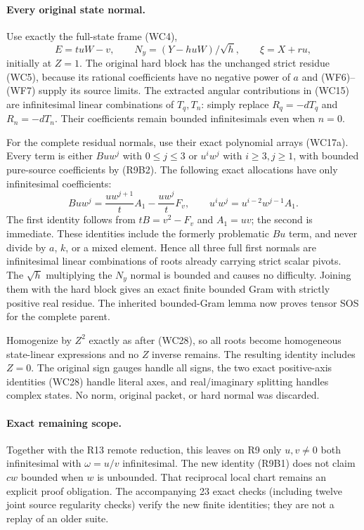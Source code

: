 \paragraph{Every original state normal.}
Use exactly the full-state frame (WC4),
\[
 E=tuW-v,\qquad N_y=(Y-huW)/\sqrt h,
 \qquad \xi=X+ru,
\]
initially at $Z=1$. The original hard block has the unchanged
strict residue (WC5), because its rational coefficients have no
negative power of $a$ and (WF6)--(WF7) supply its source limits.
The extracted angular contributions in (WC15) are infinitesimal
linear combinations of $T_q,T_n$: simply replace
$R_q=-dT_q$ and $R_n=-dT_n$. Their coefficients remain bounded
infinitesimals even when $n=0$.

For the complete residual normals, use their exact polynomial
arrays (WC17a). Every term is either $Buw^j$ with $0\le j\le3$
or $u^iw^j$ with $i\ge3,j\ge1$, with bounded pure-source
coefficients by (R9B2). The following exact allocations have only
infinitesimal coefficients:
\[
 \boxed{
 Buw^j=\frac{u w^{j+1}}t A_1-\frac{u w^j}t F_v,
 \qquad
 u^iw^j=u^{i-2}w^{j-1}A_1.}                         \tag{R9B4}
\]
The first identity follows from $tB=v^2-F_v$ and $A_1=uv$;
the second is immediate. These identities include the formerly
problematic $Bu$ term, and never divide by $a$, $k$, or a mixed
element. Hence all three full first normals are infinitesimal
linear combinations of roots already carrying strict scalar
pivots. The $\sqrt h$ multiplying the $N_y$ normal is bounded
and causes no difficulty. Joining them with the hard block gives
an exact finite bounded Gram with strictly positive real residue.
The inherited bounded-Gram lemma now proves tensor SOS for the
complete parent.

Homogenize by $Z^2$ exactly as after (WC28), so all roots become
homogeneous state-linear expressions and no $Z$ inverse remains.
The resulting identity includes $Z=0$. The original sign gauges
handle all signs, the two exact positive-axis identities (WC28)
handle literal axes, and real/imaginary splitting handles complex
states. No norm, original packet, or hard normal was discarded.

\paragraph{Exact remaining scope.}
Together with the R13 remote reduction, this leaves on R9 only
$u,v\ne0$ both infinitesimal with $\omega=u/v$ infinitesimal.
The new identity (R9B1) does not claim $cw$ bounded when $w$ is
unbounded. That reciprocal local chart remains an explicit proof
obligation. The accompanying 23 exact checks (including twelve
joint source regularity checks) verify the new finite identities;
they are not a replay of an older suite.
